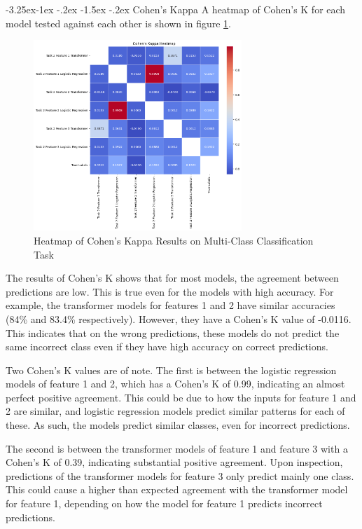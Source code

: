 \documentclass[10.7pt, onecolumn]{article}
\makeatletter
\renewcommand\subsubsection{\@startsection{subsubsection}{3}{\z@}%
	{-3.25ex\@plus -1ex \@minus -.2ex}%
    {-1.5ex \@plus -.2ex}%
    {\normalfont\itshape}}
\makeatother
\begin{document}
\subsubsection{Cohen's Kappa}
A heatmap of Cohen's K for each model tested against each other is shown in figure \ref{fig:cohenK}.
\begin{figure}[H]
  \centering
  \includegraphics[width=0.7\textwidth]{images/CohensK.png}
  \caption{Heatmap of Cohen's Kappa Results on Multi-Class Classification Task}
  \label{fig:cohenK}
\end{figure}

The results of Cohen's K shows that for most models, the agreement between predictions are low. This is true even for the models with high accuracy. For example, the transformer models for features 1 and 2 have similar accuracies (84\% and 83.4\% respectively). However, they have a Cohen's K value of -0.0116. This indicates that on the wrong predictions, these models do not predict the same incorrect class even if they have high accuracy on correct predictions.

Two Cohen's K values are of note. The first is between the logistic regression models of feature 1 and 2, which has a Cohen's K of 0.99, indicating an almost perfect positive agreement. This could be due to how the inputs for feature 1 and 2 are similar, and logistic regression models predict similar patterns for each of these. As such, the models predict similar classes, even for incorrect predictions.

The second is between the transformer models of feature 1 and feature 3 with a Cohen's K of 0.39, indicating substantial positive agreement. Upon inspection, predictions of the transformer models for feature 3 only predict mainly one class. This could cause a higher than expected agreement with the transformer model for feature 1, depending on how the model for feature 1 predicts incorrect predictions.
\end{document}
